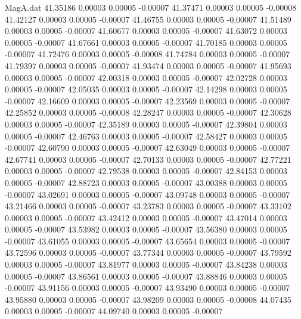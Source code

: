 \begin{filecontents}{MagA.dat}
  41.35186    0.00003    0.00005   -0.00007
  41.37471    0.00003    0.00005   -0.00008
  41.42127    0.00003    0.00005   -0.00007
  41.46755    0.00003    0.00005   -0.00007
  41.51489    0.00003    0.00005   -0.00007
  41.60677    0.00003    0.00005   -0.00007
  41.63072    0.00003    0.00005   -0.00007
  41.67661    0.00003    0.00005   -0.00007
  41.70185    0.00003    0.00005   -0.00007
  41.72476    0.00003    0.00005   -0.00008
  41.74784    0.00003    0.00005   -0.00007
  41.79397    0.00003    0.00005   -0.00007
  41.93474    0.00003    0.00005   -0.00007
  41.95693    0.00003    0.00005   -0.00007
  42.00318    0.00003    0.00005   -0.00007
  42.02728    0.00003    0.00005   -0.00007
  42.05035    0.00003    0.00005   -0.00007
  42.14298    0.00003    0.00005   -0.00007
  42.16609    0.00003    0.00005   -0.00007
  42.23569    0.00003    0.00005   -0.00007
  42.25852    0.00003    0.00005   -0.00008
  42.28247    0.00003    0.00005   -0.00007
  42.30628    0.00003    0.00005   -0.00007
  42.35189    0.00003    0.00005   -0.00007
  42.39804    0.00003    0.00005   -0.00007
  42.46763    0.00003    0.00005   -0.00007
  42.58427    0.00003    0.00005   -0.00007
  42.60790    0.00003    0.00005   -0.00007
  42.63049    0.00003    0.00005   -0.00007
  42.67741    0.00003    0.00005   -0.00007
  42.70133    0.00003    0.00005   -0.00007
  42.77221    0.00003    0.00005   -0.00007
  42.79538    0.00003    0.00005   -0.00007
  42.84153    0.00003    0.00005   -0.00007
  42.88723    0.00003    0.00005   -0.00007
  43.00388    0.00003    0.00005   -0.00007
  43.02691    0.00003    0.00005   -0.00007
  43.09748    0.00003    0.00005   -0.00007
  43.21466    0.00003    0.00005   -0.00007
  43.23783    0.00003    0.00005   -0.00007
  43.33102    0.00003    0.00005   -0.00007
  43.42412    0.00003    0.00005   -0.00007
  43.47014    0.00003    0.00005   -0.00007
  43.53982    0.00003    0.00005   -0.00007
  43.56380    0.00003    0.00005   -0.00007
  43.61055    0.00003    0.00005   -0.00007
  43.65654    0.00003    0.00005   -0.00007
  43.72596    0.00003    0.00005   -0.00007
  43.77344    0.00003    0.00005   -0.00007
  43.79592    0.00003    0.00005   -0.00007
  43.81977    0.00003    0.00005   -0.00007
  43.84238    0.00003    0.00005   -0.00007
  43.86561    0.00003    0.00005   -0.00007
  43.88846    0.00003    0.00005   -0.00007
  43.91156    0.00003    0.00005   -0.00007
  43.93490    0.00003    0.00005   -0.00007
  43.95880    0.00003    0.00005   -0.00007
  43.98209    0.00003    0.00005   -0.00008
  44.07435    0.00003    0.00005   -0.00007
  44.09740    0.00003    0.00005   -0.00007

\end{filecontents}
